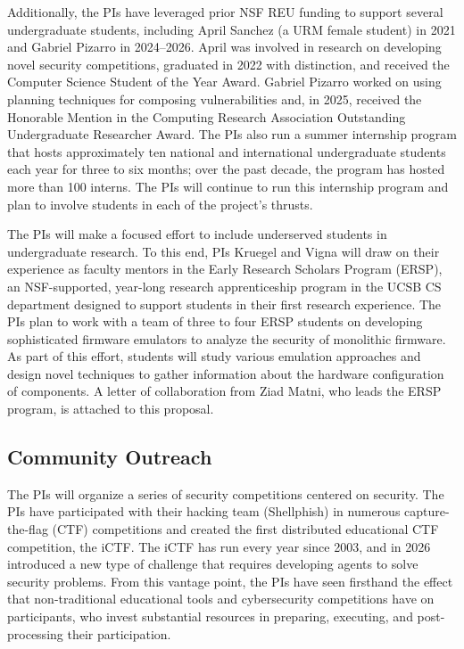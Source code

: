 Additionally, the PIs have leveraged prior NSF REU funding to support
several undergraduate students, including April Sanchez (a URM female
student) in 2021 and Gabriel Pizarro in 2024--2026. April was
involved in research on developing novel security competitions,
graduated in 2022 with distinction, and received the Computer Science
Student of the Year Award. Gabriel Pizarro worked on using planning
techniques for composing vulnerabilities and, in 2025, received the
Honorable Mention in the Computing Research Association Outstanding
Undergraduate Researcher Award. The PIs also run a summer internship
program that hosts approximately ten national and international
undergraduate students each year for three to six months; over the
past decade, the program has hosted more than 100 interns. The PIs
will continue to run this internship program and plan to involve
students in each of the project's thrusts.

The PIs will make a focused effort to include underserved students in
undergraduate research. To this end, PIs Kruegel and Vigna will draw
on their experience as faculty mentors in the Early Research Scholars
Program (ERSP), an NSF-supported, year-long research apprenticeship
program in the UCSB CS department designed to support students in
their first research experience. The PIs plan to work with a team of
three to four ERSP students on developing sophisticated firmware
emulators to analyze the security of monolithic firmware. As part of
this effort, students will study various emulation approaches and
design novel techniques to gather information about the hardware
configuration of \cps components. A letter of collaboration from
Ziad Matni, who leads the ERSP program, is attached to this proposal.

\subsection{Community Outreach}

The PIs will organize a series of security competitions centered on
\cps security. The PIs have participated with their hacking team
(Shellphish) in numerous capture-the-flag (CTF) competitions and
created the first distributed educational CTF competition, the iCTF.
The iCTF has run every year since 2003, and in 2026 introduced a new
type of challenge that requires developing agents to solve security
problems. From this vantage point, the PIs have seen firsthand the
effect that non-traditional educational tools and cybersecurity
competitions have on participants, who invest substantial resources
in preparing, executing, and post-processing their participation.

